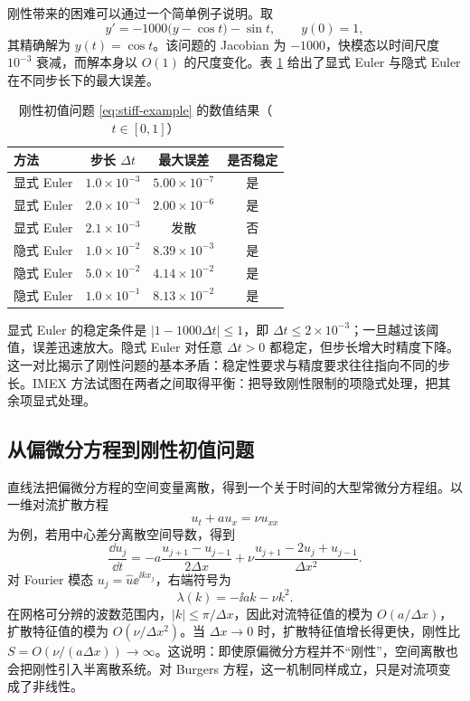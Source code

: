 刚性带来的困难可以通过一个简单例子说明。取
\begin{equation}
  y'=-1000\bigl(y-\cos t\bigr)-\sin t,\qquad y(0)=1,
  \label{eq:stiff-example}
\end{equation}
其精确解为 $y(t)=\cos t$。该问题的 Jacobian 为 $-1000$，快模态以时间尺度 $10^{-3}$ 衰减，而解本身以 $O(1)$ 的尺度变化。表 \ref{tab:stiff-example} 给出了显式 Euler 与隐式 Euler 在不同步长下的最大误差。

\begin{table}[htbp]
  \centering
  \caption{刚性初值问题 \eqref{eq:stiff-example} 的数值结果（$t\in[0,1]$）}
  \label{tab:stiff-example}
  \begin{tabular}{lccc}
    \toprule
    方法 & 步长 $\Delta t$ & 最大误差 & 是否稳定 \\
    \midrule
    显式 Euler & $1.0\times10^{-3}$ & $5.00\times10^{-7}$ & 是 \\
    显式 Euler & $2.0\times10^{-3}$ & $2.00\times10^{-6}$ & 是 \\
    显式 Euler & $2.1\times10^{-3}$ & 发散 & 否 \\
    \midrule
    隐式 Euler & $1.0\times10^{-2}$ & $8.39\times10^{-3}$ & 是 \\
    隐式 Euler & $5.0\times10^{-2}$ & $4.14\times10^{-2}$ & 是 \\
    隐式 Euler & $1.0\times10^{-1}$ & $8.13\times10^{-2}$ & 是 \\
    \bottomrule
  \end{tabular}
\end{table}

显式 Euler 的稳定条件是 $|1-1000\Delta t|\le1$，即 $\Delta t\le2\times10^{-3}$；一旦越过该阈值，误差迅速放大。隐式 Euler 对任意 $\Delta t>0$ 都稳定，但步长增大时精度下降。这一对比揭示了刚性问题的基本矛盾：稳定性要求与精度要求往往指向不同的步长。IMEX 方法试图在两者之间取得平衡：把导致刚性限制的项隐式处理，把其余项显式处理。

\subsection{从偏微分方程到刚性初值问题}

直线法把偏微分方程的空间变量离散，得到一个关于时间的大型常微分方程组。以一维对流扩散方程
\begin{equation}
  u_t+a u_x=\nu u_{xx}
  \label{eq:adv-diff}
\end{equation}
为例，若用中心差分离散空间导数，得到
\begin{equation}
  \frac{\dd u_j}{\dd t}
  =-a\frac{u_{j+1}-u_{j-1}}{2\Delta x}
  +\nu\frac{u_{j+1}-2u_j+u_{j-1}}{\Delta x^2}.
  \label{eq:adv-diff-semi}
\end{equation}
对 Fourier 模态 $u_j=\hat u\ee^{\ii kx_j}$，右端符号为
\begin{equation}
  \lambda(k)=-\ii ak-\nu k^2.
  \label{eq:adv-diff-symbol}
\end{equation}
在网格可分辨的波数范围内，$|k|\le\pi/\Delta x$，因此对流特征值的模为 $O(a/\Delta x)$，扩散特征值的模为 $O(\nu/\Delta x^2)$。当 $\Delta x\to0$ 时，扩散特征值增长得更快，刚性比 $S=O(\nu/(a\Delta x))\to\infty$。这说明：即使原偏微分方程并不“刚性”，空间离散也会把刚性引入半离散系统。对 Burgers 方程，这一机制同样成立，只是对流项变成了非线性。


